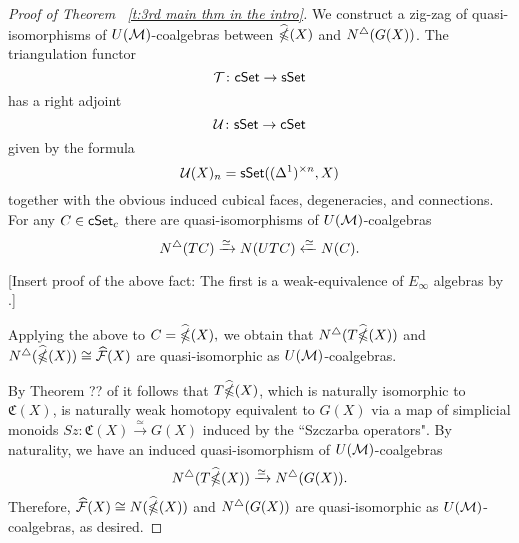 \begin{proof}[Proof of Theorem ~\ref{t:3rd main thm in the intro}]

We construct a zig-zag of quasi-isomorphisms of $U(\mathcal{M})$-coalgebras between $\widehat{\mathbb{\Omega}}(X)$ and $N^{\triangle} (G(X))$.
The triangulation functor $$\mathcal{T}\colon \mathsf{cSet} \to \mathsf{sSet}$$
has a right adjoint $$\mathcal{U}\colon \mathsf{sSet} \to \mathsf{cSet}$$
given by the formula
$$\mathcal{U}(X)_n= \mathsf{sSet}((\Delta^1)^{\times n}, X)$$
together with the obvious induced cubical faces, degeneracies, and connections. For any $C \in \mathsf{cSet}_c$ there are quasi-isomorphisms of $U(\mathcal{M})$-coalgebras
$$N^{\triangle}(TC) \xrightarrow{\simeq} N(UTC) \xleftarrow{\simeq} N(C).$$

[Insert proof of the above fact: The first is a weak-equivalence of $E_\infty$ algebras by \cite{medina2021cubical}.]

Applying the above to $C= \widehat{\mathbb{\Omega}}(X),$ we obtain that $N^{\triangle}(T\widehat{\mathbb{\Omega}}(X))$ and $N^{\triangle}(\widehat{\mathbb{\Omega}}(X)) \cong \widehat{\mathcal{F}}(X)$ are quasi-isomorphic as $U(\mathcal{M})$-coalgebras. 

By Theorem ?? of \cite{minichello-rivera-zeinalian} it follows that $T\widehat{\mathbb{\Omega}}(X)$, which is naturally isomorphic to $\mathfrak{C}(X)$, is naturally weak homotopy equivalent to $G(X)$ via a map of simplicial monoids $Sz \colon \mathfrak{C}(X) \xrightarrow{\simeq} G(X)$ induced by the ``Szczarba operators". By naturality, we have an induced quasi-isomorphism of $U(\mathcal{M})$-coalgebras
$$N^{\triangle}(T\widehat{\mathbb{\Omega}}(X)) \xrightarrow{\simeq} N^{\triangle}(G(X)).$$
Therefore, $\widehat{\mathcal{F}}(X) \cong N(\widehat{\mathbb{\Omega}}(X))$ and $N^{\triangle}(G(X))$ are quasi-isomorphic as $U(\mathcal{M})$-coalgebras, as desired. 




\end{proof}